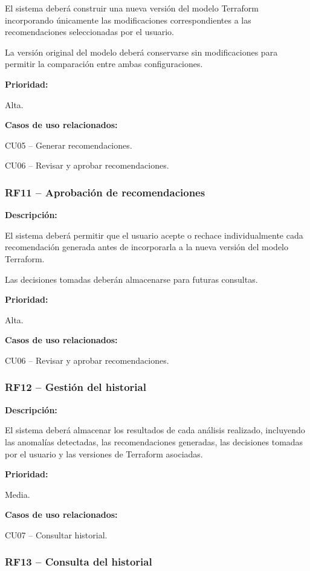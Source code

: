 El sistema deberá construir una nueva versión del modelo Terraform incorporando únicamente las modificaciones correspondientes a las recomendaciones seleccionadas por el usuario.

La versión original del modelo deberá conservarse sin modificaciones para permitir la comparación entre ambas configuraciones.

\noindent \textbf{Prioridad:}

Alta.

\noindent \textbf{Casos de uso relacionados:}

\noindent CU05 -- Generar recomendaciones.

CU06 -- Revisar y aprobar recomendaciones.

\subsubsection{RF11 -- Aprobación de recomendaciones}

\noindent \textbf{Descripción:}

El sistema deberá permitir que el usuario acepte o rechace individualmente cada recomendación generada antes de incorporarla a la nueva versión del modelo Terraform.

Las decisiones tomadas deberán almacenarse para futuras consultas.

\noindent \textbf{Prioridad:}

Alta.

\noindent \textbf{Casos de uso relacionados:}

\noindent CU06 -- Revisar y aprobar recomendaciones.

\subsubsection{RF12 -- Gestión del historial}

\noindent \textbf{Descripción:}

El sistema deberá almacenar los resultados de cada análisis realizado, incluyendo las anomalías detectadas, las recomendaciones generadas, las decisiones tomadas por el usuario y las versiones de Terraform asociadas.

\noindent \textbf{Prioridad:}

Media.

\noindent \textbf{Casos de uso relacionados:}

\noindent CU07 -- Consultar historial.

\subsubsection{RF13 -- Consulta del historial}

